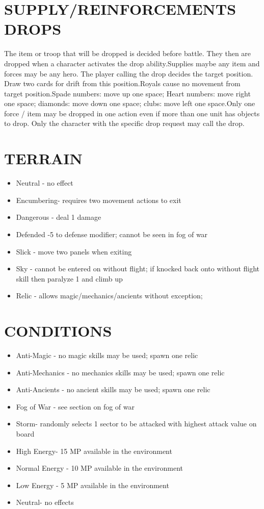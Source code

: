 \section{SUPPLY/REINFORCEMENTS DROPS}
The item or troop that will be dropped is decided before battle.  They then are dropped when a character activates the drop ability.Supplies maybe any item and forces may be any hero.  The player calling the drop decides the target position.  Draw two cards for drift from this position.Royals cause no movement from target position.Spade numbers: move up one space; Heart numbers: move right one space; diamonds: move down one space; clubs: move left one space.Only one force
/ item may be dropped in one action even if more than one unit has objects to drop.  Only the character with the specific drop request may call the drop.
\section{TERRAIN}
\begin{itemize}
\item Neutral - no effect
\item Encumbering- requires two movement actions to exit
\item Dangerous - deal 1 damage
\item Defended -5 to defense modifier; cannot be seen in fog of war
\item Slick - move two panels when exiting
\item Sky - cannot be entered on without flight; if knocked back onto without flight skill then paralyze 1 and climb up
\item Relic - allows magic/mechanics/ancients without exception; 
\end{itemize}
\section {CONDITIONS}
\begin{itemize}
\item Anti-Magic - no magic skills may be used; spawn one relic
\item Anti-Mechanics - no mechanics skills may be used; spawn one relic
\item Anti-Ancients - no ancient skills may be used; spawn one relic
\item Fog of War - see section on fog of war
\item Storm- randomly selects 1 sector to be attacked with highest attack value on board
\item High Energy- 15 MP available in the environment
\item Normal Energy - 10 MP available in the environment
\item Low Energy - 5 MP available in the environment
\item Neutral- no effects
\end{itemize}
